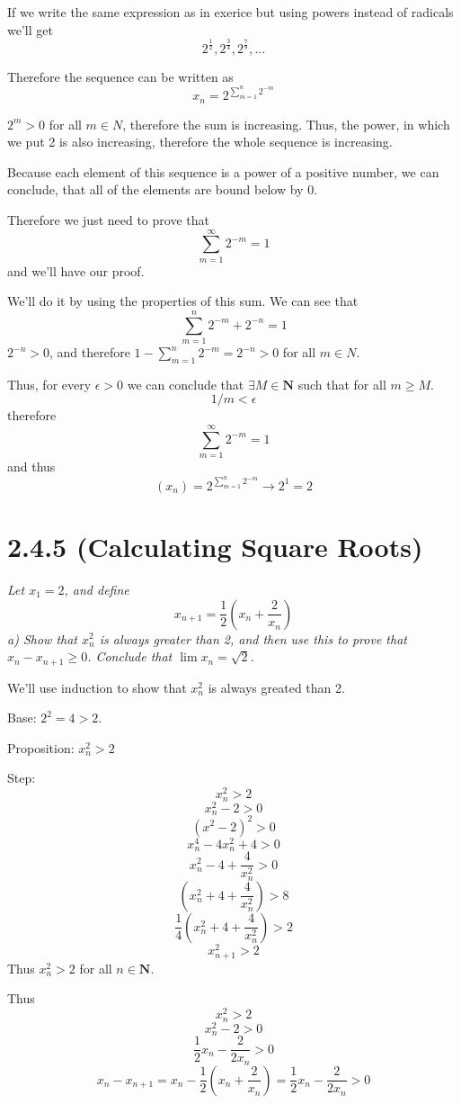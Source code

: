 \documentclass[11pt,oneside,titlepage]{book}
\begin{document}
If we write the same expression as in exerice but using powers instead of
radicals we'll get
$$ 2^{\frac{1}{2}}, 2^{\frac{3}{4}}, 2^{\frac{7}{8}}, ...$$ 

Therefore the sequence can be written as
$$x_n =  2 ^{\sum_{m = 1}^n 2^{-m}}$$

$2^m > 0$ for all $m \in N$, therefore the sum is increasing. Thus, the power, in
which we put 2 is also increasing, therefore the whole sequence is increasing.

Because each element of this sequence is a power of a positive number, we can
conclude, that all of the elements are bound below by 0.

Therefore we just need to prove that 
$$\sum_{m = 1}^{\infty} 2^{-m} = 1$$
and we'll have our proof.

We'll do it by using the properties of this sum. We can see that
$$\sum_{m = 1}^{n}2^{-m} + 2^{-n} = 1$$
$2^{-n} > 0$, and therefore $1 - \sum_{m = 1}^{n}2^{-m} = 2^{-n} > 0$ for
all $m \in N$.

Thus, for every $\epsilon > 0$ we can conclude that $\exists M \in \textbf{N}$ such
that for all $m \geq M$.
$$1/m < \epsilon$$
therefore
$$\sum_{m = 1}^{\infty} 2^{-m} = 1$$
and thus
$$(x_n) =  2 ^{\sum_{m = 1}^n 2^{-m}} \to 2^1 = 2$$

\section*{2.4.5 (Calculating Square Roots)}
\textit{Let $x_1 = 2$, and define }
$$x_{n+1} = \frac{1}{2}(x_n + \frac{2}{x_n})$$
\textit{a) Show that $x_n^2$ is always greater than 2, and then use this to prove
  that $x_n - x_{n + 1} \geq 0$. Conclude that $\lim x_n = \sqrt{2}$.  }

We'll use induction to show that $x_n^2$ is always greated than 2.

Base: $2 ^2 = 4 > 2$.

Proposition: $x_n ^ 2 > 2$

Step:
$$x_n^2 > 2$$
$$x_n^2 - 2 > 0$$
$$(x^2 - 2)^2 > 0$$
$$x_n ^ 4 - 4 x_n^2 + 4 > 0$$
$$x_n ^ 2 - 4 + \frac{4}{x_n^2} > 0$$
$$(x_n ^ 2 + 4 + \frac{4}{x_n^2}) > 8$$
$$\frac{1}{4}(x_n ^ 2 + 4 + \frac{4}{x_n^2}) > 2$$
$$x_{n + 1}^2 > 2$$
Thus $x_n^2 > 2$ for all $n \in \textbf{N}$.

Thus
$$x_n^2  > 2$$
$$x_n^2 - 2 > 0$$
$$\frac{1}{2}x_n - \frac{2}{2 x_n} > 0$$
$$x_n - x_{n + 1} = x_n - \frac{1}{2}(x_n + \frac{2}{x_n}) = \frac{1}{2}x_n - \frac{2}{2x_n} > 0$$
\end{document}

